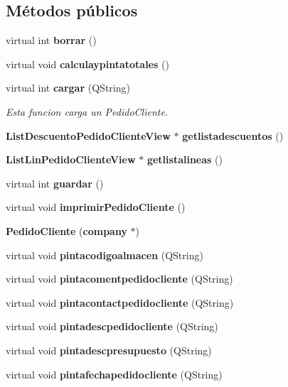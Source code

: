 \subsection*{M\'{e}todos p\'{u}blicos}
\begin{CompactItemize}
\item 
virtual int {\bf borrar} ()\label{classPedidoCliente_a0}

\item 
virtual void {\bf calculaypintatotales} ()
\item 
virtual int {\bf cargar} (QString)\label{classPedidoCliente_a2}

\begin{CompactList}\small\item\em Esta funcion carga un Pedido\-Cliente. \item\end{CompactList}\item 
{\bf List\-Descuento\-Pedido\-Cliente\-View} $\ast$ {\bf getlistadescuentos} ()\label{classPedidoCliente_a3}

\item 
{\bf List\-Lin\-Pedido\-Cliente\-View} $\ast$ {\bf getlistalineas} ()\label{classPedidoCliente_a4}

\item 
virtual int {\bf guardar} ()\label{classPedidoCliente_a5}

\item 
virtual void {\bf imprimir\-Pedido\-Cliente} ()
\item 
{\bf Pedido\-Cliente} ({\bf company} $\ast$)\label{classPedidoCliente_a7}

\item 
virtual void {\bf pintacodigoalmacen} (QString)\label{classPedidoCliente_a8}

\item 
virtual void {\bf pintacomentpedidocliente} (QString)\label{classPedidoCliente_a9}

\item 
virtual void {\bf pintacontactpedidocliente} (QString)\label{classPedidoCliente_a10}

\item 
virtual void {\bf pintadescpedidocliente} (QString)\label{classPedidoCliente_a11}

\item 
virtual void {\bf pintadescpresupuesto} (QString)\label{classPedidoCliente_a12}

\item 
virtual void {\bf pintafechapedidocliente} (QString)\label{classPedidoCliente_a13}


\end{CompactItemize}
